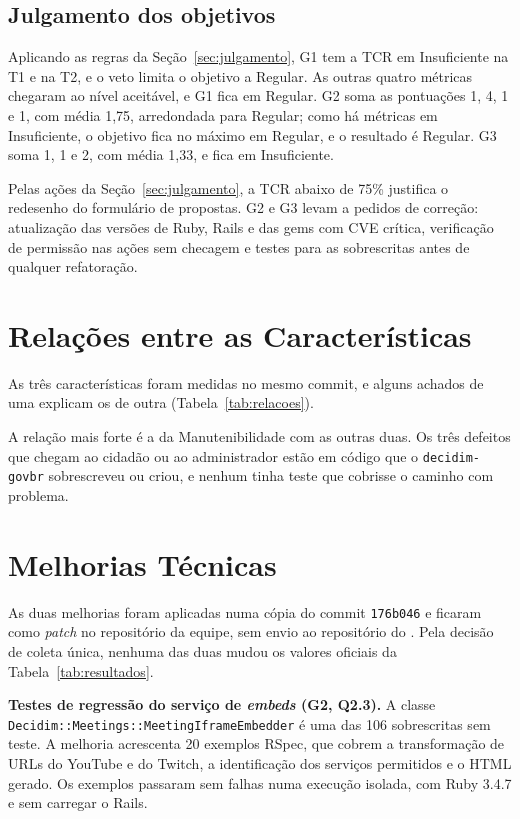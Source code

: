 \documentclass[journal]{IEEEtran}
\begin{document}
\subsection{Julgamento dos objetivos}
\label{sec:julgamento_obj}

Aplicando as regras da Seção~\ref{sec:julgamento}, G1 tem a TCR em Insuficiente na T1 e na T2, e o veto limita o objetivo a Regular. As outras quatro métricas chegaram ao nível aceitável, e G1 fica em Regular. G2 soma as pontuações 1, 4, 1 e 1, com média 1,75, arredondada para Regular; como há métricas em Insuficiente, o objetivo fica no máximo em Regular, e o resultado é Regular. G3 soma 1, 1 e 2, com média 1,33, e fica em Insuficiente.

Pelas ações da Seção~\ref{sec:julgamento}, a TCR abaixo de 75\% justifica o redesenho do formulário de propostas. G2 e G3 levam a pedidos de correção: atualização das versões de Ruby, Rails e das gems com CVE crítica, verificação de permissão nas ações sem checagem e testes para as sobrescritas antes de qualquer refatoração.

\section{Relações entre as Características}
\label{sec:relacoes}

As três características foram medidas no mesmo commit, e alguns achados de uma explicam os de outra (Tabela~\ref{tab:relacoes}).

A relação mais forte é a da Manutenibilidade com as outras duas. Os três defeitos que chegam ao cidadão ou ao administrador estão em código que o \texttt{decidim-govbr} sobrescreveu ou criou, e nenhum tinha teste que cobrisse o caminho com problema.

\section{Melhorias Técnicas}
\label{sec:melhorias}

As duas melhorias foram aplicadas numa cópia do commit \texttt{176b046} e ficaram como \textit{patch} no repositório da equipe, sem envio ao repositório do . Pela decisão de coleta única, nenhuma das duas mudou os valores oficiais da Tabela~\ref{tab:resultados}.

\textbf{Testes de regressão do serviço de \textit{embeds} (G2, Q2.3).} A classe \texttt{Decidim::Meetings::MeetingIframeEmbedder} é uma das 106 sobrescritas sem teste. A melhoria acrescenta 20 exemplos RSpec, que cobrem a transformação de URLs do YouTube e do Twitch, a identificação dos serviços permitidos e o HTML gerado. Os exemplos passaram sem falhas numa execução isolada, com Ruby 3.4.7 e sem carregar o Rails.
\end{document}
